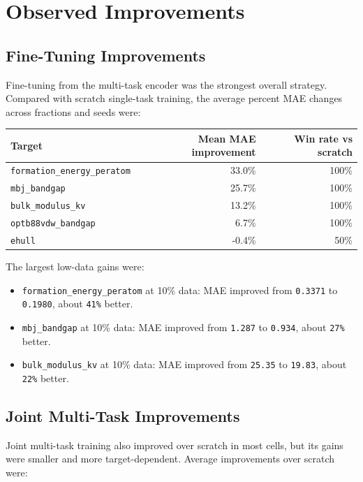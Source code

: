 \documentclass[11pt,a4paper]{article}
\begin{document}
\section{Observed Improvements}

\subsection{Fine-Tuning Improvements}

Fine-tuning from the multi-task encoder was the strongest overall strategy.  Compared with scratch single-task training, the average percent MAE changes across fractions and seeds were:

\begin{center}
\begin{tabular}{lrr}
\toprule
Target & Mean MAE improvement & Win rate vs scratch \\
\midrule
\texttt{formation\_energy\_peratom} & 33.0\% & 100\% \\
\texttt{mbj\_bandgap} & 25.7\% & 100\% \\
\texttt{bulk\_modulus\_kv} & 13.2\% & 100\% \\
\texttt{optb88vdw\_bandgap} & 6.7\% & 100\% \\
\texttt{ehull} & -0.4\% & 50\% \\
\bottomrule
\end{tabular}
\end{center}

The largest low-data gains were:

\begin{itemize}
  \item \texttt{formation\_energy\_peratom} at 10\% data: MAE improved from \texttt{0.3371} to \texttt{0.1980}, about \texttt{41\%} better.
  \item \texttt{mbj\_bandgap} at 10\% data: MAE improved from \texttt{1.287} to \texttt{0.934}, about \texttt{27\%} better.
  \item \texttt{bulk\_modulus\_kv} at 10\% data: MAE improved from \texttt{25.35} to \texttt{19.83}, about \texttt{22\%} better.
\end{itemize}

\subsection{Joint Multi-Task Improvements}

Joint multi-task training also improved over scratch in most cells, but its gains were smaller and more target-dependent.  Average improvements over scratch were:
\end{document}
